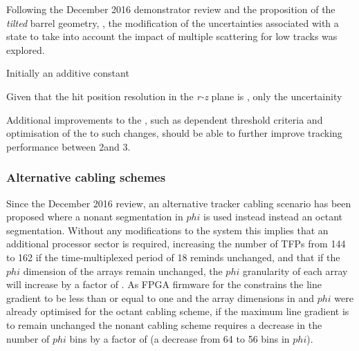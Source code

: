 
Following the December 2016 demonstrator review and the proposition of the \emph{tilted} barrel geometry, , the modification of the uncertainties associated with a \KF state to take into account the impact of multiple scattering for low \pT tracks was explored.

Initially an additive constant 

Given that the hit position resolution in the \emph{r-z} plane is , only the uncertainity 


Additional improvements to the \HT, such as \pt dependent threshold criteria and optimisation of the \KF to such changes, should be able to further improve tracking performance between 2\GeV and 3\GeV.

\subsubsection{Alternative cabling schemes}
Since the December 2016 review, an alternative tracker cabling scenario has been proposed where a nonant segmentation in $phi$ is used instead instead an octant segmentation.
Without any modifications to the system this implies that an additional processor sector is required, increasing the number of TFPs from 144 to 162 if the time-multiplexed period of 18 reminds unchanged, and that if the $phi$ dimension of the \HT arrays remain unchanged, the $phi$ granularity of each \HT array will increase by a factor of .
As FPGA firmware for the \HT constrains the \HT line gradient to be less than or equal to one and the \HT array dimensions in \qPt and $phi$ were already optimised for the octant cabling scheme, if the maximum \HT line gradient is to remain unchanged the nonant cabling scheme requires a decrease in the number of $phi$ bins by a factor of  (\ie a decrease from 64 to 56 bins in $phi$).



